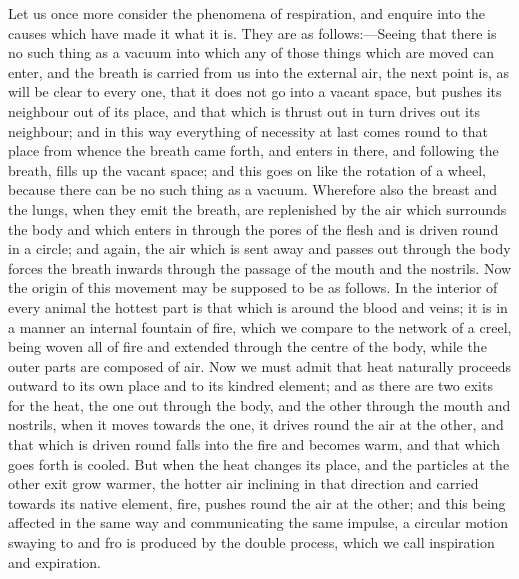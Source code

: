 Let us once more consider the phenomena of respiration, and enquire into
the causes which have made it what it is. They are as follows:—Seeing
that there is no such thing as a vacuum into which any of those things
which are moved can enter, and the breath is carried from us into the
external air, the next point is, as will be clear to every one, that it
does not go into a vacant space, but pushes its neighbour out of its
place, and that which is thrust out in turn drives out its neighbour; and
in this way everything of necessity at last comes round to that place from
whence the breath came forth, and enters in there, and following the
breath, fills up the vacant space; and this goes on like the rotation of a
wheel, because there can be no such thing as a vacuum. Wherefore also the
breast and the lungs, when they emit the breath, are replenished by the
air which surrounds the body and which enters in through the pores of the
flesh and is driven round in a circle; and again, the air which is sent
away and passes out through the body forces the breath inwards through the
passage of the mouth and the nostrils. Now the origin of this movement may
be supposed to be as follows. In the interior of every animal the hottest
part is that which is around the blood and veins; it is in a manner an
internal fountain of fire, which we compare to the network of a creel,
being woven all of fire and extended through the centre of the body, while
the outer parts are composed of air. Now we must admit that heat naturally
proceeds outward to its own place and to its kindred element; and as there
are two exits for the heat, the one out through the body, and the other
through the mouth and nostrils, when it moves towards the one, it drives
round the air at the other, and that which is driven round falls into the
fire and becomes warm, and that which goes forth is cooled. But when the
heat changes its place, and the particles at the other exit grow warmer,
the hotter air inclining in that direction and carried towards its native
element, fire, pushes round the air at the other; and this being affected
in the same way and communicating the same impulse, a circular motion
swaying to and fro is produced by the double process, which we call
inspiration and expiration.

